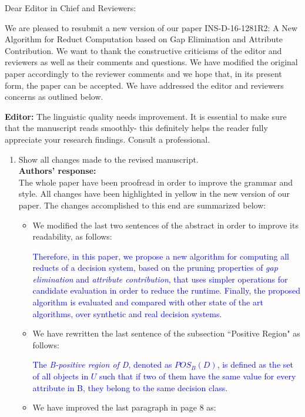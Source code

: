 \documentclass{letter}
\begin{document}
\begin{letter}{}
  \opening{Dear Editor in Chief and Reviewers:}

  We are pleased to resubmit a new version of our paper INS-D-16-1281R2: A New Algorithm for Reduct Computation based on Gap Elimination and Attribute Contribution. We want to thank the constructive criticisms of the editor and reviewers as well as their comments and questions. We have modified the original paper accordingly to the reviewer comments and we hope that, in its present form, the paper can be accepted. We have addressed the editor and reviewers concerns as outlined below.

  \textbf{Editor:} 
  The linguistic quality needs improvement. It is essential to make sure that  the manuscript reads smoothly- this definitely helps the reader fully appreciate your research findings. Consult a professional. 
  \begin{enumerate}
	\item Show all changes made to the revised manuscript. \\
	\textbf{Authors’ response:} \\
	The whole paper have been proofread in order to improve the grammar and style. All changes have been highlighted in yellow in the new version of our paper. The changes accomplished to this end are summarized below:
	\begin{itemize}		
		\item We modified the last two sentences of the abstract in order to improve its readability, as follows:
		
		\textcolor{blue}{Therefore, in this paper, we propose a new algorithm for computing all reducts of a decision system, based on the pruning properties of \textit{gap  elimination} and \textit{attribute contribution}, that uses simpler operations for candidate evaluation in order to reduce the runtime. Finally, the proposed algorithm is evaluated and compared with other state of the art algorithms, over synthetic and real decision systems.}
				 
		\item We have rewritten the last sentence of the subsection ``Positive Region" as follows:
		
	    \textcolor{blue}{The \textit{B-positive region of D}, denoted as $POS_B(D)$, is defined as the set of all objects in $U$ such that if two of them have the same value for every attribute in B, they belong to the same decision class.}
		
		\item We have improved the last paragraph in page 8 as:
		

\end{itemize}
\end{enumerate}
\end{letter}
\end{document}
